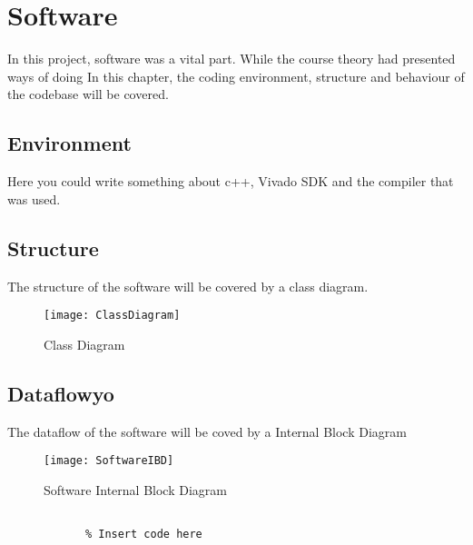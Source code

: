 \documentclass[Main]{subfiles}
\begin{document}
\section{Software} %
\label{sec:software}

	In this project, software was a vital part. 
	While the course theory had presented ways of doing 
	In this chapter, the coding environment, structure and behaviour of the codebase will be covered.
	
	\subsection{Environment} %
	\label{sub:software_environment}

		Here you could write something about c++, Vivado SDK and the compiler that was used.
	
	\subsection{Structure} %
	\label{sub:software_structure}
	
		The structure of the software will be covered by a class diagram.
		\begin{figure}[H]
			\centering
			\texttt{[image: ClassDiagram]}
			\caption{Class Diagram}
			\label{fig:classdiagram}
		\end{figure}

	\subsection{Dataflowyo} %
	\label{sub:software_dataflow}
		
		The dataflow of the software will be coved by a Internal Block Diagram
		
		\begin{figure}[H]
			\centering
			\texttt{[image: SoftwareIBD]}
			\caption{Software Internal Block Diagram}
			\label{fig:softwareibd}
		\end{figure}

		\begin{lstlisting}[caption=Example of CNN setup, style=Code-Matlab, label=lst:cnn_setup]

			% Insert code here

		\end{lstlisting}

\end{document}
